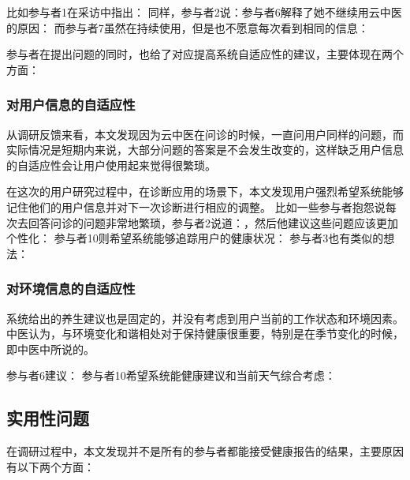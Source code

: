 比如参与者1在采访中指出：
同样，参与者2说：参与者6解释了她不继续用云中医的原因：
而参与者7虽然在持续使用，但是也不愿意每次看到相同的信息：

参与者在提出问题的同时，也给了对应提高系统自适应性的建议，主要体现在两个方面：

\subsubsection{对用户信息的自适应性}

从调研反馈来看，本文发现因为云中医在问诊的时候，一直问用户同样的问题，而实际情况是短期内来说，大部分问题的答案是不会发生改变的，这样缺乏用户信息的自适应性会让用户使用起来觉得很繁琐。

在这次的用户研究过程中，在诊断应用的场景下，本文发现用户强烈希望系统能够记住他们的用户信息并对下一次诊断进行相应的调整。
比如一些参与者抱怨说每次去回答问诊的问题非常地繁琐，参与者2说道：，然后他建议这些问题应该更加个性化：
参与者10则希望系统能够追踪用户的健康状况：
参与者3也有类似的想法：

\subsubsection{对环境信息的自适应性}

系统给出的养生建议也是固定的，并没有考虑到用户当前的工作状态和环境因素。中医认为，与环境变化和谐相处对于保持健康很重要，特别是在季节变化的时候，即中医中所说的。

参与者6建议：
参与者10希望系统能健康建议和当前天气综合考虑：


\subsection{实用性问题}
在调研过程中，本文发现并不是所有的参与者都能接受健康报告的结果，主要原因有以下两个方面：

